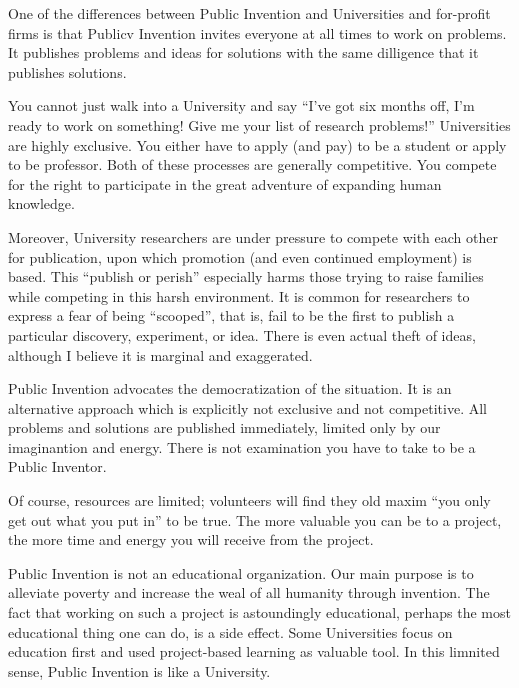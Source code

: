 \documentclass[
	fontsize=10pt, %
	twoside=false, %
	secnumdepth=1, %
]{kaobook}
\begin{document}
One of the differences between Public Invention and
Universities and for-profit firms is that Publicv Invention
invites everyone at all times to work on problems.
It publishes problems and ideas for solutions with the same
dilligence that it publishes solutions.

You cannot just walk into a University and say ``I've got
six months off, I'm ready to work on something! Give me
your list of research problems!''
Universities are highly exclusive.
You either have to apply (and pay) to be a student or
apply to be professor. Both of these processes are
generally competitive. You compete for the right to
participate in the great adventure of expanding
human knowledge.

Moreover, University researchers are under pressure
to compete with each other for publication, upon which
promotion (and even continued employment) is based.
This ``publish or perish'' especially harms
those trying to raise families while
competing in this harsh environment.
It is common for researchers to express a fear of
being ``scooped'', that is, fail to be the first
to publish a particular discovery, experiment, or idea.
There is even actual theft of ideas, although I believe
it is marginal and exaggerated.


Public Invention advocates the democratization
of the situation. It is an alternative approach
which is explicitly not exclusive and not competitive.
All problems and solutions are published immediately,
limited only by our imaginantion and energy.
There is not examination you have to take to be
a Public Inventor.

Of course, resources are limited; volunteers will
find they old maxim ``you only get out what you put in'' to be true.
The more valuable you can be to a project, the more time
and energy you will receive from the project.

Public Invention is not an educational organization.
Our main purpose is to alleviate poverty and increase the
weal of all humanity through invention.
The fact that working on such a project is astoundingly
educational, perhaps the most educational thing one can do,
is a side effect. Some Universities focus on education
first and used project-based learning as valuable tool.
In this limnited sense, Public Invention is like a University.
\end{document}
